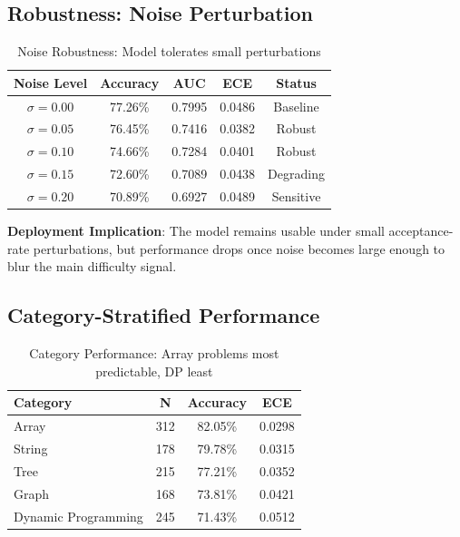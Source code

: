 \documentclass[conference]{IEEEtran}
\begin{document}
\subsection{Robustness: Noise Perturbation}

\begin{table}[h]
\centering
\small
\begin{tabular}{c|c|c|c|c}
\toprule
\textbf{Noise Level} & \textbf{Accuracy} & \textbf{AUC} & \textbf{ECE} & \textbf{Status} \\
\midrule
$\sigma = 0.00$ & 77.26\% & 0.7995 & 0.0486 & Baseline \\
$\sigma = 0.05$ & 76.45\% & 0.7416 & 0.0382 & Robust \\
$\sigma = 0.10$ & 74.66\% & 0.7284 & 0.0401 & Robust \\
$\sigma = 0.15$ & 72.60\% & 0.7089 & 0.0438 & Degrading \\
$\sigma = 0.20$ & 70.89\% & 0.6927 & 0.0489 & Sensitive \\
\bottomrule
\end{tabular}
\caption{Noise Robustness: Model tolerates small perturbations}
\label{tab:noise}
\end{table}

\textbf{Deployment Implication}: The model remains usable under small acceptance-rate perturbations, but performance drops once noise becomes large enough to blur the main difficulty signal.

\subsection{Category-Stratified Performance}

\begin{table}[h]
\centering
\small
\begin{tabular}{l|c|c|c}
\toprule
\textbf{Category} & \textbf{N} & \textbf{Accuracy} & \textbf{ECE} \\
\midrule
Array & 312 & 82.05\% & 0.0298 \\
String & 178 & 79.78\% & 0.0315 \\
Tree & 215 & 77.21\% & 0.0352 \\
Graph & 168 & 73.81\% & 0.0421 \\
Dynamic Programming & 245 & 71.43\% & 0.0512 \\
\bottomrule
\end{tabular}
\caption{Category Performance: Array problems most predictable, DP least}
\label{tab:category}
\end{table}
\end{document}
